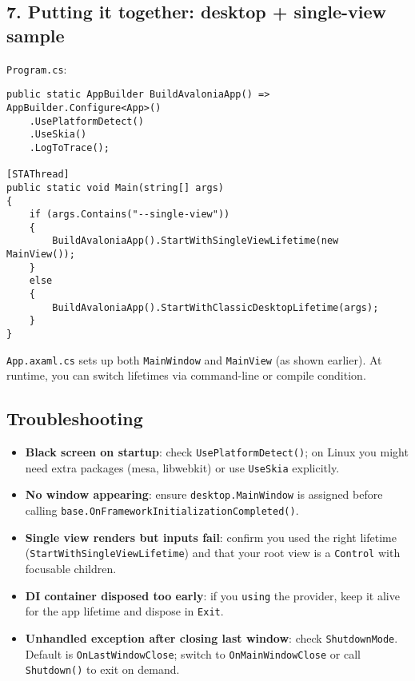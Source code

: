 \subsection{7. Putting it together: desktop + single-view
sample}\label{putting-it-together-desktop-single-view-sample}

\passthrough{\lstinline!Program.cs!}:

\begin{lstlisting}
public static AppBuilder BuildAvaloniaApp() => AppBuilder.Configure<App>()
    .UsePlatformDetect()
    .UseSkia()
    .LogToTrace();

[STAThread]
public static void Main(string[] args)
{
    if (args.Contains("--single-view"))
    {
        BuildAvaloniaApp().StartWithSingleViewLifetime(new MainView());
    }
    else
    {
        BuildAvaloniaApp().StartWithClassicDesktopLifetime(args);
    }
}
\end{lstlisting}

\passthrough{\lstinline!App.axaml.cs!} sets up both
\passthrough{\lstinline!MainWindow!} and
\passthrough{\lstinline!MainView!} (as shown earlier). At runtime, you
can switch lifetimes via command-line or compile condition.

\subsection{Troubleshooting}\label{troubleshooting-1}

\begin{itemize}
\tightlist
\item
  \textbf{Black screen on startup}: check
  \passthrough{\lstinline!UsePlatformDetect()!}; on Linux you might need
  extra packages (mesa, libwebkit) or use
  \passthrough{\lstinline!UseSkia!} explicitly.
\item
  \textbf{No window appearing}: ensure
  \passthrough{\lstinline!desktop.MainWindow!} is assigned before
  calling
  \passthrough{\lstinline!base.OnFrameworkInitializationCompleted()!}.
\item
  \textbf{Single view renders but inputs fail}: confirm you used the
  right lifetime (\passthrough{\lstinline!StartWithSingleViewLifetime!})
  and that your root view is a \passthrough{\lstinline!Control!} with
  focusable children.
\item
  \textbf{DI container disposed too early}: if you
  \passthrough{\lstinline!using!} the provider, keep it alive for the
  app lifetime and dispose in \passthrough{\lstinline!Exit!}.
\item
  \textbf{Unhandled exception after closing last window}: check
  \passthrough{\lstinline!ShutdownMode!}. Default is
  \passthrough{\lstinline!OnLastWindowClose!}; switch to
  \passthrough{\lstinline!OnMainWindowClose!} or call
  \passthrough{\lstinline!Shutdown()!} to exit on demand.
\end{itemize}

